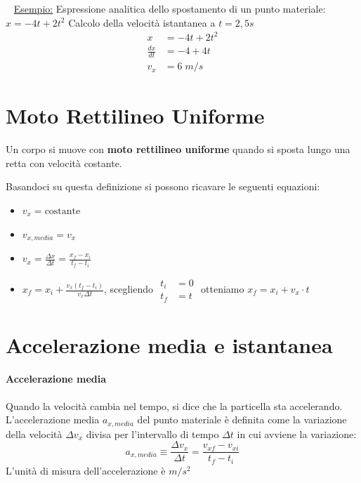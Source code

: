 \documentclass[a4paper,11pt,oneside]{book}
\begin{document}
~\newline
\underline{Esempio:} \newline
Espressione analitica dello spostamento di un punto materiale: $x=-4t + 2t^2$
Calcolo della velocità istantanea a $t = 2,5s$
\begin{align*}
    x             & = -4t + 2t^2 \\
    \frac{dx}{dt} & = -4 + 4t    \\
    v_x           & = 6 \; m/s
\end{align*}

\section{Moto Rettilineo Uniforme}
Un corpo si muove con \textbf{moto rettilineo uniforme} quando si sposta lungo una retta con velocità costante.

Basandoci su questa definizione si possono ricavare le seguenti equazioni:
\begin{itemize}
    \item $v_x = \text{costante}$
    \item $v_{x,media} = v_x$
    \item $v_x = \frac{\Delta x}{\Delta t} = \frac{x_f - x_i}{t_f - t_i}$
    \item $x_f = x_i + \frac{v_x(t_f - t_i)}{v_x \Delta t}$, scegliendo \tiny $\begin{aligned} t_i&=0 \\ t_f&=t \end{aligned}$ \normalsize otteniamo $x_f = x_i + v_x \cdot t$
\end{itemize}

\section{Accelerazione media e istantanea}

\paragraph{Accelerazione media} Quando la velocità cambia nel tempo, si dice che la particella sta accelerando.
L’accelerazione media $a_{x,media}$ del punto materiale è definita come la variazione della velocità
$\Delta v_x$ divisa per l’intervallo di tempo $\Delta t$ in cui avviene la variazione:
\begin{equation*}
    a_{x,media} \equiv \frac{\Delta v_x}{\Delta t} = \frac{v_{xf} - v_{xi}}{t_f - t_i   }
\end{equation*}
L'unità di misura dell'accelerazione è $m/s^2$
\end{document}

